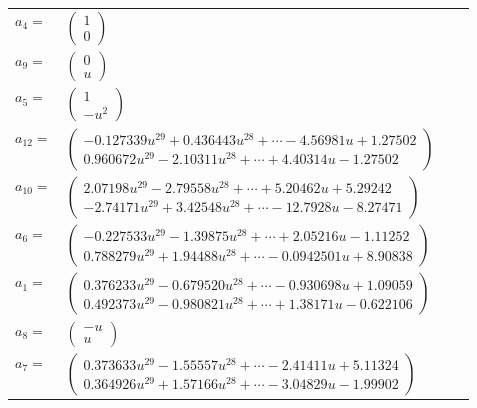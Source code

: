 \documentclass[1p]{elsarticle_modified}
\theoremstyle{definition}
\begin{document}
\begin{tabular}{m{7pt} m{180pt} m{7pt} m{180pt} }
\flushright $a_{4}=$&$\begin{pmatrix}1\\0\end{pmatrix}$ \\
\flushright $a_{9}=$&$\begin{pmatrix}0\\u\end{pmatrix}$ \\
\flushright $a_{5}=$&$\begin{pmatrix}1\\- u^2\end{pmatrix}$ \\
\flushright $a_{12}=$&$\begin{pmatrix}-0.127339 u^{29}+0.436443 u^{28}+\cdots-4.56981 u+1.27502\\0.960672 u^{29}-2.10311 u^{28}+\cdots+4.40314 u-1.27502\end{pmatrix}$ \\
\flushright $a_{10}=$&$\begin{pmatrix}2.07198 u^{29}-2.79558 u^{28}+\cdots+5.20462 u+5.29242\\-2.74171 u^{29}+3.42548 u^{28}+\cdots-12.7928 u-8.27471\end{pmatrix}$ \\
\flushright $a_{6}=$&$\begin{pmatrix}-0.227533 u^{29}-1.39875 u^{28}+\cdots+2.05216 u-1.11252\\0.788279 u^{29}+1.94488 u^{28}+\cdots-0.0942501 u+8.90838\end{pmatrix}$ \\
\flushright $a_{1}=$&$\begin{pmatrix}0.376233 u^{29}-0.679520 u^{28}+\cdots-0.930698 u+1.09059\\0.492373 u^{29}-0.980821 u^{28}+\cdots+1.38171 u-0.622106\end{pmatrix}$ \\
\flushright $a_{8}=$&$\begin{pmatrix}- u\\u\end{pmatrix}$ \\
\flushright $a_{7}=$&$\begin{pmatrix}0.373633 u^{29}-1.55557 u^{28}+\cdots-2.41411 u+5.11324\\0.364926 u^{29}+1.57166 u^{28}+\cdots-3.04829 u-1.99902\end{pmatrix}$ \\

\end{tabular}
\end{document}
